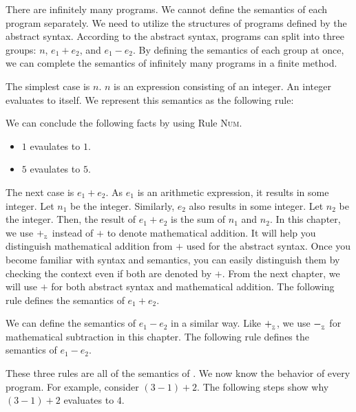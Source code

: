 There are infinitely many programs. We cannot define the semantics of each
program separately. We need to utilize the structures of programs defined by the
abstract syntax. According to the abstract syntax, programs can split into three
groups: $n$, $e_1+e_2$, and $e_1-e_2$. By defining the semantics of each group
at once, we can complete the semantics of infinitely many programs in a finite
method.

The simplest case is $n$. $n$ is an expression consisting of an integer. An
integer evaluates to itself. We represent this semantics as the following rule:


We can conclude the following facts by using Rule \textsc{Num}.

\begin{itemize}
  \item $1$ evaulates to $1$.
  \item $5$ evaulates to $5$.
\end{itemize}

The next case is $e_1+e_2$. As $e_1$ is an arithmetic expression, it results in
some integer. Let $n_1$ be the integer. Similarly, $e_2$ also results in some
integer. Let $n_2$ be the integer. Then, the result of $e_1+e_2$ is the sum of
$n_1$ and $n_2$. In this chapter, we use $+_{{}_{\mathbb{Z}}}$ instead of $+$ to denote
mathematical addition. It will help you distinguish mathematical addition from
$+$ used for the abstract syntax. Once you become familiar with syntax and
semantics, you can easily distinguish them by checking the context even if both
are denoted by $+$. From the next chapter, we will use $+$ for both abstract
syntax and mathematical addition. The following rule defines the semantics of
$e_1+e_2$.


We can define the semantics of $e_1-e_2$ in a similar way. Like $+_{{}_{\mathbb{Z}}}$,
we use $-_{{}_{\mathbb{Z}}}$ for mathematical subtraction in this chapter. The
following rule defines the semantics of $e_1-e_2$.


These three rules are all of the semantics of \lang. We now know the behavior of
every \lang program. For example, consider $(3-1)+2$. The following steps
show why $(3-1)+2$ evaluates to $4$.

